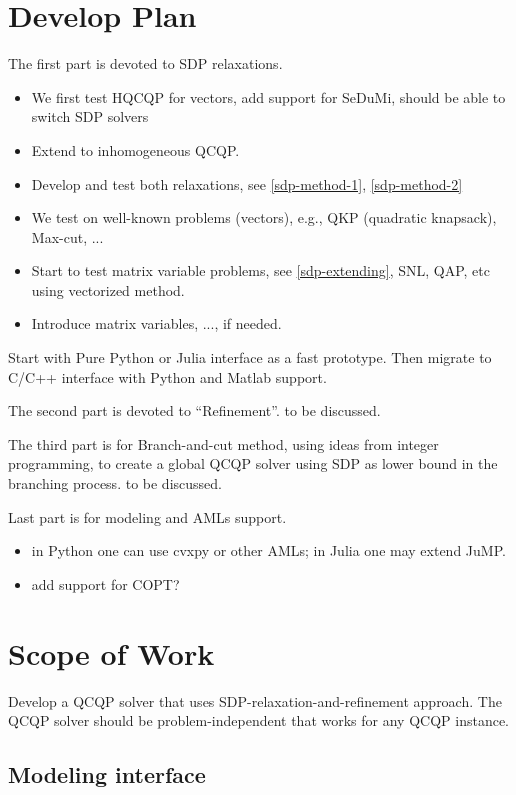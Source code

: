 \documentclass[../main]{subfiles}
\begin{document}
\section{Develop Plan}

The first part is devoted to SDP relaxations.

\begin{itemize}
      \tightlist
      \item We first test HQCQP for vectors, add support for SeDuMi, should be able to switch SDP solvers
      \item Extend to inhomogeneous QCQP.
      \item Develop and test both relaxations, see \ref{sdp-method-1}, \ref{sdp-method-2}
      \item We test on well-known problems (vectors), e.g., QKP (quadratic knapsack), Max-cut, ...
      \item Start to test matrix variable problems, see \ref{sdp-extending}, SNL, QAP,
            etc using vectorized method.
      \item Introduce matrix variables, ..., if needed.
\end{itemize}

Start with Pure Python or Julia interface as a fast prototype. Then migrate to C/C++ interface with Python and Matlab support.

The second part is devoted to ``Refinement''. to be discussed.

The third part is for Branch-and-cut method, using ideas from integer programming,
to create a global QCQP solver using SDP as lower bound in the branching process. to be discussed.

Last part is for modeling and AMLs support.

\begin{itemize}
      \tightlist
      \item in Python one can use cvxpy or other AMLs; in Julia one may extend JuMP.
      \item add support for COPT?
\end{itemize}

\section{Scope of Work}
Develop a QCQP solver that uses SDP-relaxation-and-refinement approach.
The QCQP solver should be problem-independent that works for any QCQP
instance.
\subsection{Modeling interface}\label{modeling-interface}
\end{document}
